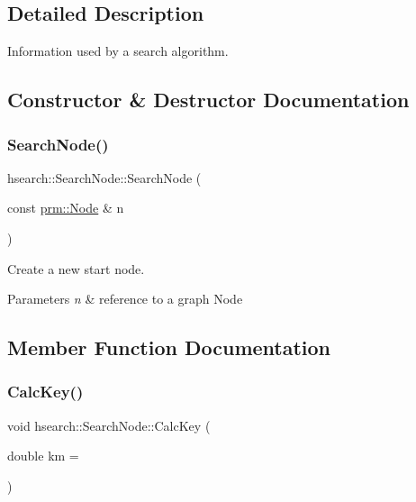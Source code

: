 \subsection{Detailed Description}
Information used by a search algorithm. 

\subsection{Constructor \& Destructor Documentation}
\mbox{\label{structhsearch_1_1SearchNode_abc34e7eab1d4b3d269f9b360b77936a5}} 
\subsubsection{\texorpdfstring{Search\+Node()}{SearchNode()}}
{\footnotesize\ttfamily hsearch\+::\+Search\+Node\+::\+Search\+Node (\begin{DoxyParamCaption}\item[{const \hyperlink{structprm_1_1Node}{prm\+::\+Node} \&}]{n }\end{DoxyParamCaption})}



Create a new start node. 


\begin{DoxyParams}{Parameters}
{\em n} & reference to a graph Node \\
\hline
\end{DoxyParams}


\subsection{Member Function Documentation}
\mbox{\label{structhsearch_1_1SearchNode_a0b8eea07c7013c327c70723182e43561}} 
\subsubsection{\texorpdfstring{Calc\+Key()}{CalcKey()}}
{\footnotesize\ttfamily void hsearch\+::\+Search\+Node\+::\+Calc\+Key (\begin{DoxyParamCaption}\item[{double}]{km = {} }\end{DoxyParamCaption})}



